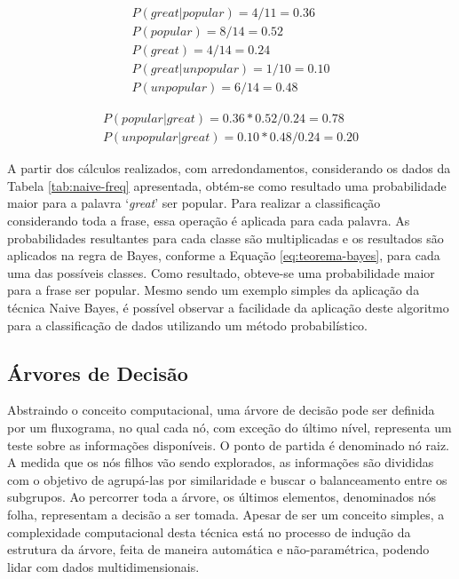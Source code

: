 \documentclass[oneside,openright,12pt]{ufsm_2015} %
\begin{document}
    \begin{align}
    P(great|popular) = 4/11 = 0.36 \\
    P(popular) = 8/14 = 0.52 \\
    P(great) = 4/14 = 0.24 \\
    P(great|unpopular) = 1/10 = 0.10 \\
    P(unpopular) = 6/14 = 0.48
    \end{align}
    
    \begin{align}
    P(popular|great) = 0.36 * 0.52 / 0.24 = 0.78 \\
    P(unpopular|great) = 0.10 * 0.48 / 0.24 = 0.20
    \end{align}
    
    \par A partir dos cálculos realizados, com arredondamentos, considerando os dados da Tabela \ref{tab:naive-freq} apresentada, obtém-se como resultado uma probabilidade maior para a palavra `\textit{great}' ser popular. Para realizar a classificação considerando toda a frase, essa operação é aplicada para cada palavra. As probabilidades resultantes para cada classe são multiplicadas e os resultados são aplicados na regra de Bayes, conforme a Equação \ref{eq:teorema-bayes}, para cada uma das possíveis classes. Como resultado, obteve-se uma probabilidade maior para a frase ser popular. Mesmo sendo um exemplo simples da aplicação da técnica Naive Bayes, é possível observar a facilidade da aplicação deste algoritmo para a classificação de dados utilizando um método probabilístico.


\subsection{Árvores de Decisão}
\label{sec:fund-arvores-decisao}

    \par Abstraindo o conceito computacional, uma árvore de decisão pode ser definida por um fluxograma, no qual cada nó, com exceção do último nível, representa um teste sobre as informações disponíveis. O ponto de partida é denominado nó raiz. A medida que os nós filhos vão sendo explorados, as informações são divididas com o objetivo de agrupá-las por similaridade e buscar o balanceamento entre os subgrupos. Ao percorrer toda a árvore, os últimos elementos, denominados nós folha, representam a decisão a ser tomada. Apesar de ser um conceito simples, a complexidade computacional desta técnica está no processo de indução da estrutura da árvore, feita de maneira automática e não-paramétrica, podendo lidar com dados multidimensionais. 
    
\end{document}
